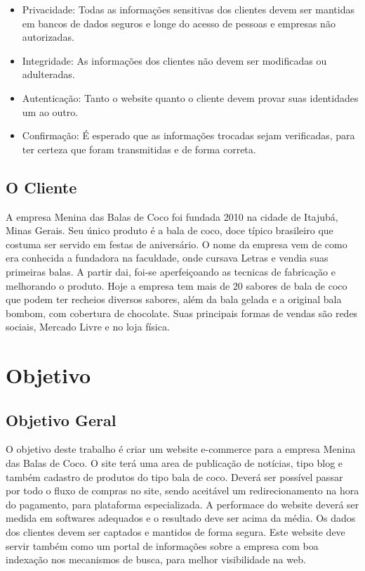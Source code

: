 \documentclass[
	12pt,				%
    oneside,			%
	a4paper,			%
	english,			%
	french,				%
	spanish,			%
	brazil				%
	]{abntex2}
\begin{document}
\begin{itemize}
  \item Privacidade: Todas as informações sensitivas dos clientes devem ser mantidas em bancos de dados seguros e longe do acesso de pessoas e empresas não autorizadas.
  \item Integridade: As informações dos clientes não devem ser modificadas ou adulteradas.
  \item Autenticação: Tanto o website quanto o cliente devem provar suas identidades um ao outro.
  \item Confirmação: É esperado que as informações trocadas sejam verificadas, para ter certeza que foram transmitidas e de forma correta.
\end{itemize}

\section{O Cliente}

A empresa Menina das Balas de Coco foi fundada 2010 na cidade de Itajubá, Minas Gerais. Seu único produto é a bala de coco, doce típico brasileiro que costuma ser servido em festas de aniversário. O nome da empresa vem de como era conhecida a fundadora na faculdade, onde cursava Letras e vendia suas primeiras balas. A partir dai, foi-se aperfeiçoando as tecnicas de fabricação e melhorando o produto. Hoje a empresa tem mais de 20 sabores de bala de coco que podem ter recheios diversos sabores, além da bala gelada e a original bala bombom, com cobertura de chocolate. Suas principais formas de vendas são redes sociais, Mercado Livre e no loja física.

\chapter{Objetivo}

\section{Objetivo Geral}

O objetivo deste trabalho é criar um website e-commerce para a empresa Menina das Balas de Coco. O site terá uma area de publicação de notícias, tipo blog e também cadastro de produtos do tipo bala de coco. Deverá ser possível passar por todo o fluxo de compras no site, sendo aceitável um redirecionamento na hora do pagamento, para plataforma especializada. A performace do website deverá ser medida em softwares adequados e o resultado deve ser acima da média. Os dados dos clientes devem ser captados e mantidos de forma segura. Este website deve servir também como um portal de informações sobre a empresa com boa indexação nos mecanismos de busca, para melhor visibilidade na web.
\end{document}
